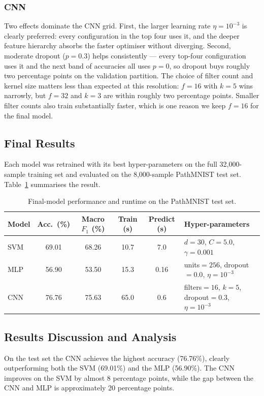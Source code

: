 \documentclass[../main.tex]{subfiles}
\begin{document}
\subsubsection{CNN}
\noindent
Two effects dominate the CNN grid. First, the larger learning rate
$\eta{=}10^{-3}$ is clearly preferred: every configuration in the
top four uses it, and the deeper feature hierarchy absorbs the faster
optimiser without diverging. Second, moderate dropout ($p{=}0.3$)
helps consistently — every top-four configuration uses it and the next
band of accuracies all uses $p{=}0$, so dropout buys roughly two
percentage points on the validation partition. The choice of filter
count and kernel size matters less than expected at this resolution:
$f{=}16$ with
$k{=}5$ wins narrowly, but
$f{=}32$ and $k{=}3$ are within roughly two percentage points. Smaller filter
counts also train substantially faster, which is one reason we keep
$f{=}16$ for the final model.

\subsection{Final Results}
\noindent
Each model was retrained with its best hyper-parameters on the full
32{,}000-sample training set and evaluated on the 8{,}000-sample
PathMNIST test set. Table~\ref{tab.final} summarises the result.

\begin{table}[H]
    \centering
    \caption{Final-model performance and runtime on the PathMNIST test
    set.}
    \label{tab.final}
    \begin{tabularx}{\linewidth}{lcccc>{\raggedright\arraybackslash}X}
        \toprule
        \textbf{Model} & \textbf{Acc.\ (\%)} &
        \textbf{Macro $F_{1}$ (\%)} & \textbf{Train (s)} &
        \textbf{Predict (s)} & \textbf{Hyper-parameters} \\
        \midrule
        SVM & 69.01 & 68.26 & 10.7 & 7.0 & $d{=}30$, $C{=}5.0$, $\gamma{=}0.001$ \\
        MLP & 56.90 & 53.50 & 15.3 & 0.16 & units${=}256$, dropout${=}0.0$, $\eta{=}10^{-3}$ \\
        CNN & 76.76 & 75.63 & 65.0 & 0.6 & filters${=}16$, $k{=}5$, dropout${=}0.3$, $\eta{=}10^{-3}$ \\
        \bottomrule
    \end{tabularx}
\end{table}

\subsection{Results Discussion and Analysis}
\noindent
On the test set the CNN achieves the highest accuracy
(76.76\%), clearly outperforming both the SVM (69.01\%) and the
MLP (56.90\%). The CNN improves on the SVM by almost
8 percentage points, while the gap between the CNN and MLP
is approximately 20 percentage points.
\end{document}
